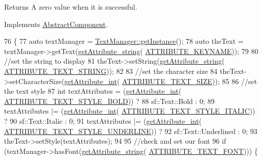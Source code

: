 \begin{DoxyReturn}{Returns}
A zero value when it is successful. 
\end{DoxyReturn}


Implements \hyperlink{class_abstract_component_a35c9cab4e3845a947609b6ada8dc89cf}{Abstract\-Component}.


\begin{DoxyCode}
76                           \{
77     \textcolor{keyword}{auto} textManager = \hyperlink{class_text_manager_abf9e79079b6ccf917b3cd3a100c7e7bb}{TextManager::getInstance}();
78     \textcolor{keyword}{auto} theText = textManager->getText(\hyperlink{class_abstract_component_a4140957094ef40c4ffaa0ef381d00ce5}{getAttribute\_string}(
      \hyperlink{_a_e___attributes_8h_a38d48cad306c55d90faa362aa5023de8}{ATTRIBUTE\_KEYNAME}));
79 
80     \textcolor{comment}{//set the string to display}
81     theText->setString(\hyperlink{class_abstract_component_a4140957094ef40c4ffaa0ef381d00ce5}{getAttribute\_string}(
      \hyperlink{_a_e___attributes_8h_a4d13d9bfe85868610a12fb7b392ff417}{ATTRIBUTE\_TEXT\_STRING}));
82 
83     \textcolor{comment}{//set the character size}
84     theText->setCharacterSize(\hyperlink{class_abstract_component_a16ac644f742683149b78d01b787eb3bd}{getAttribute\_int}(
      \hyperlink{_a_e___attributes_8h_a70c9ec177cd9577d55d0a6a80d1f42df}{ATTRIBUTE\_TEXT\_SIZE}));
85 
86     \textcolor{comment}{//set the text style}
87     \textcolor{keywordtype}{int} textAttributes = (\hyperlink{class_abstract_component_a16ac644f742683149b78d01b787eb3bd}{getAttribute\_int}(
      \hyperlink{_a_e___attributes_8h_a1d58f347df93f4aa7a658a90b6762917}{ATTRIBUTE\_TEXT\_STYLE\_BOLD})) ?
88         sf::Text::Bold : 0;
89     textAttributes |= (\hyperlink{class_abstract_component_a16ac644f742683149b78d01b787eb3bd}{getAttribute\_int}(
      \hyperlink{_a_e___attributes_8h_a3393f6b47bd2b686269135c1fa532216}{ATTRIBUTE\_TEXT\_STYLE\_ITALIC})) ?
90         sf::Text::Italic : 0;
91     textAttributes |= (\hyperlink{class_abstract_component_a16ac644f742683149b78d01b787eb3bd}{getAttribute\_int}(
      \hyperlink{_a_e___attributes_8h_a918ec55de79782adea7bdd8c15f4e4ea}{ATTRIBUTE\_TEXT\_STYLE\_UNDERLINE})) ?
92         sf::Text::Underlined : 0;
93     theText->setStyle(textAttributes);
94 
95     \textcolor{comment}{//check and set our font}
96     \textcolor{keywordflow}{if} (textManager->hasFont(\hyperlink{class_abstract_component_a4140957094ef40c4ffaa0ef381d00ce5}{getAttribute\_string}(
      \hyperlink{_a_e___attributes_8h_a13b5d39e16142e79a137e0377f0f56cf}{ATTRIBUTE\_TEXT\_FONT}))) \{

\end{DoxyCode}

